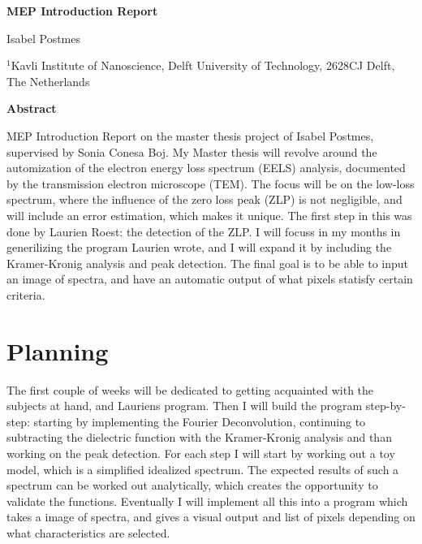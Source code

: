 \documentclass[12pt,a4paper]{article}
\numberwithin{equation}{section}
\numberwithin{figure}{section}
\numberwithin{table}{section}
\begin{document}




\begin{center}
  {\Large \bf MEP Introduction Report}
\vspace{1.4cm}

Isabel Postmes

\vspace{1.0cm}
 
{\it \small

$^{1}$Kavli Institute of Nanoscience, Delft University of Technology, 2628CJ Delft, The
  Netherlands\\[0.1cm]

}

\vspace{1.0cm}

{\bf \large Abstract}

\end{center}

MEP Introduction Report on the master thesis project of Isabel Postmes, supervised by Sonia Conesa Boj.
My Master thesis will revolve around the automization of the electron energy loss spectrum (EELS) analysis, documented by the transmission electron microscope (TEM). The focus will be on the low-loss spectrum, where the influence of the zero loss peak (ZLP) is not negligible, and will include an error estimation, which makes it unique. The first step in this was done by Laurien Roest: the detection of the ZLP. I will focuss in my months in generilizing the program Laurien wrote, and I will expand it by including the Kramer-Kronig analysis and peak detection. The final goal is to be able to input an image of spectra, and have an automatic output of what pixels statisfy certain criteria. 



\clearpage
\tableofcontents

\section{Planning}
The first couple of weeks will be dedicated to getting acquainted with the subjects at hand, and Lauriens program. Then I will build the program step-by-step: starting by implementing the Fourier Deconvolution, continuing to subtracting the dielectric function with the Kramer-Kronig analysis and than working on the peak detection. For each step I will start by working out a toy model, which is a simplified idealized spectrum. The expected results of such a spectrum can be worked out analytically, which creates the opportunity to validate the functions. Eventually I will implement all this into a program which takes a image of spectra, and gives a visual output and list of pixels depending on what characteristics are selected. 
\end{document}

